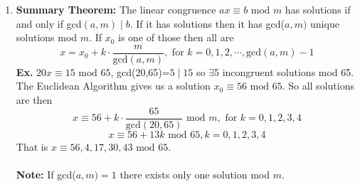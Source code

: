 \documentclass[class=article, crop=false]{standalone}
\begin{document}
\begin{enumerate}[1.]
	\item \textbf{Summary Theorem:} The linear congruence $ax\equiv b\mbox{ mod }m$ has solutions
	if and only if gcd$(a,m)\mid b$. If it has solutions then it has gcd($a,m)$ unique solutions mod $m$.
	If $x_0$ is one of those then all are $$x=x_0 + k\cdot \frac{m}{\mbox{gcd}(a,m)}, \text{ for } k=0,1,2,\cdots, \mbox{gcd}(a,m)-1$$
	\textbf{Ex.} $20x\equiv 15\mbox{ mod }65$, gcd(20,65)=$5\mid 15$ so $\exists$5 incongruent solutions mod 65.
	The Euclidean Algorithm gives us a solution $x_0 \equiv 56\mbox{ mod }65$. So all solutions are then
	$$x\equiv 56 + k\cdot \frac{65}{\mbox{gcd}(20,65)}\mbox{ mod }m, \text{ for } k=0,1,2,3,4$$
	$$x\equiv 56+13k\mbox{ mod }65, k=0,1,2,3,4$$
	That is $x\equiv 56,4,17,30,43 \mbox{ mod }65$.\\\\
	\textbf{Note:} If gcd($a,m)=1$ there exists only one solution mod $m$.
	
\end{enumerate}

\end{document}
